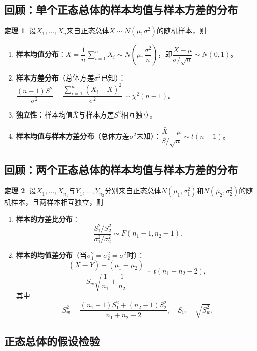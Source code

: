 \documentclass[11pt,a4paper]{report}
\theoremstyle{definition}
\newtheorem{theorem}{定理}[chapter]
\theoremstyle{plain}
\begin{document}
\subsection{回顾：单个正态总体的样本均值与样本方差的分布}

\begin{theorem}
设$X_1,\ldots,X_n$来自正态总体$X\sim N(\mu,\sigma^2)$的随机样本，则
\begin{enumerate}[label=\arabic*.,leftmargin=2em]
    \item \textbf{样本均值分布}：$\bar{X}=\dfrac{1}{n}\sum_{i=1}^{n}X_i\sim N\left(\mu,\dfrac{\sigma^2}{n}\right)$，即$\dfrac{\bar{X}-\mu}{\sigma/\sqrt{n}}\sim N(0,1)$。
    \item \textbf{样本方差分布}（总体方差$\sigma^2$已知）：$\dfrac{(n-1)S^2}{\sigma^2}=\dfrac{\sum_{i=1}^{n}(X_i-\bar{X})^2}{\sigma^2}\sim\chi^2(n-1)$。
    \item \textbf{独立性}：样本均值$\bar{X}$与样本方差$S^2$相互独立。
    \item \textbf{样本均值与样本方差分布}（总体方差$\sigma^2$未知）：$\dfrac{\bar{X}-\mu}{S/\sqrt{n}}\sim t(n-1)$。
\end{enumerate}
\end{theorem}

\subsection{回顾：两个正态总体的样本均值与样本方差的分布}

\begin{theorem}
设$X_1,\ldots,X_{n_1}$与$Y_1,\ldots,Y_{n_2}$分别来自正态总体$N(\mu_1,\sigma_1^2)$和$N(\mu_2,\sigma_2^2)$的随机样本，且两样本相互独立，则
\begin{enumerate}[label=\arabic*.,leftmargin=2em]
    \item \textbf{样本的方差比分布}：
    \[
    \frac{S_1^2/S_2^2}{\sigma_1^2/\sigma_2^2}\sim F(n_1-1,n_2-1).
    \]
    \item \textbf{样本的均值差分布}（当$\sigma_1^2=\sigma_2^2=\sigma^2$时）：
    \[
    \frac{(\bar{X}-\bar{Y})-(\mu_1-\mu_2)}{S_w\sqrt{\dfrac{1}{n_1}+\dfrac{1}{n_2}}}\sim t(n_1+n_2-2),
    \]
    其中
    \[
    S_w^2=\frac{(n_1-1)S_1^2+(n_2-1)S_2^2}{n_1+n_2-2},\quad S_w=\sqrt{S_w^2}.
    \]
\end{enumerate}
\end{theorem}

\subsection{正态总体的假设检验}
\end{document}
